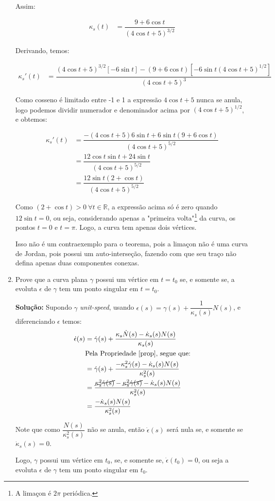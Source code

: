 \documentclass[12pt,letterpaper]{article}
\newcommand{\real}{\mathbb{R}}
\begin{document}
\begin{enumerate}[3.3.1]
  Assim:
  
  \begin{align*}
  	\kappa_s(t)&=\dfrac{9+6\cos t}{(4\cos t+5)^{3/2}}
  	\end{align*}
  
  Derivando, temos:
  
  \begin{align*}
  	\kappa_s'(t)&=\dfrac{(4\cos t+5)^{3/2}[-6\sin t]-(9+6\cos t)[-6\sin t(4\cos t+5)^{1/2}]}{(4\cos t+5)^3}
  \end{align*}

	Como cosseno é limitado entre -1 e 1 a expressão $4\cos t+5$ nunca se anula, logo podemos dividir numerador e denominador acima por $(4\cos t+5)^{1/2}$, e obtemos:
	
	\begin{align*}
		\kappa_s'(t)&=\dfrac{-(4\cos t+5)6\sin t+6\sin t(9+6\cos t)}{(4\cos t+5)^{5/2}}\\
		&=\dfrac{12\cos t\sin t+24\sin t}{(4\cos t+5)^{5/2}}\\
		&=\dfrac{12\sin t(2+\cos t)}{(4\cos t+5)^{5/2}}
	\end{align*}

	Como $(2+\cos t)>0~\forall t \in \real$, a expressão acima só é zero quando $12\sin t=0$, ou seja, considerando apenas a "primeira volta"\footnote{A limaçon é $2\pi$ periódica.} da curva, os pontos $t=0$ e $t=\pi$. Logo, a curva tem apenas dois vértices.
	
	Isso não é um contraexemplo para o teorema, pois a limaçon não é uma curva de Jordan, pois possui um auto-interseção, fazendo com que seu traço não defina apenas duas componentes conexas.
		 
		 \item Prove que a curva plana $\gamma$ possui um vértice em $t=t_0$ se, e somente se, a evoluta $\epsilon$ de $\gamma$ tem um ponto singular em $t=t_0$.
		 
		 \textbf{Solução:} Supondo $\gamma$ \textit{unit-speed}, usando $\epsilon(s)=\gamma(s)+\dfrac{1}{\kappa_s(s)}N(s)$, e diferenciando $\epsilon$ temos:
		 \begin{align*}
		 	\dot{\epsilon}(s)&=\dot \gamma (s)+\dfrac{\kappa_s\dot N(s)-\dot\kappa_s(s)N(s)}{\kappa_s(s)}\\
		 	&\text{Pela Propriedade \ref{prop}, segue que:}\\
		 	&=\dot\gamma(s)+\dfrac{-\kappa_s^2\dot\gamma(s)-\dot\kappa_s(s)N(s)}{\kappa_s^2(s)}\\
		 	&=\dfrac{\cancel{\kappa_s^2\dot\gamma(s)}-\cancel{\kappa_s^2\dot\gamma(s)}-\dot\kappa_s(s)N(s)}{\kappa_s^2(s)}\\
		 	&=\dfrac{-\dot\kappa_s(s)N(s)}{\kappa_s^2(s)}
		 \end{align*}

	Note que como $\dfrac{N(s)}{\kappa_s^2(s)}$ não se anula, então $\dot\epsilon(s)$ será nula se, e somente se $\dot\kappa_s(s)=0$.
	
	Logo, $\gamma$ possui um vértice em $t_0$, se, e somente se, $\dot\epsilon(t_0)=0$, ou seja a evoluta $\epsilon$ de $\gamma$ tem um ponto singular em $t_0$.
		 
	\end{enumerate}
	
	
	
	\newpage
%	
	\printbibliography
\end{document}
